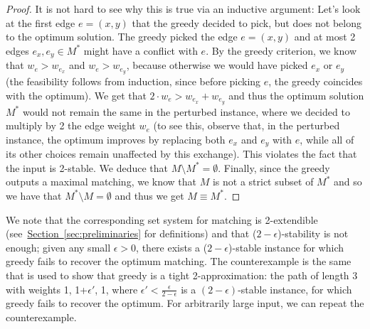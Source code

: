 \begin{proof}
It is not hard to see why this is true via an inductive argument: Let's look at the first edge $e=(x,y)$ that the greedy decided to pick, but does not belong to the optimum solution. The greedy picked the edge $e=(x,y)$ and at most 2 edges $e_x, e_y \in M^*$ might have a conflict with $e$. By the greedy criterion, we know that $w_e > w_{e_x}$ and $w_e > w_{e_y}$, because otherwise we would have picked $e_x$ or $e_y$ (the feasibility follows from induction, since before picking $e$, the greedy coincides with the optimum). We get that $2\cdot w_e > w_{e_x}+w_{e_y}$ and thus the optimum solution $M^*$ would not remain the same in the perturbed instance, where we decided to multiply by 2 the edge weight $w_e$ (to see this, observe that, in the perturbed instance, the optimum improves by replacing both $e_x$ and $e_y$ with $e$, while all of its other choices remain unaffected by this exchange). This violates the fact that the input is 2-stable. We deduce that $M\setminus M^* = \emptyset$. Finally, since the greedy outputs a maximal matching, we know that $M$ is not a strict subset of $M^*$ and so we have that $M^*\setminus M=\emptyset$ and thus we get $M\equiv M^*$.
\end{proof}

We note that the corresponding set system for matching is 2-extendible (see~\hyperref[sec:preliminaries]{Section~\ref{sec:preliminaries}} for definitions) and that ($2-\epsilon$)-stability is not enough; given any small $\epsilon>0$, there exists a ($2-\epsilon$)-stable instance for which greedy fails to recover the optimum matching. The counterexample is the same that is used to show that greedy is a tight 2-approximation: the path of length 3 with weights 1, 1+$\epsilon'$, 1, where $\epsilon'<\tfrac{\epsilon}{2-\epsilon}$ is a $(2-\epsilon)$-stable instance, for which greedy fails to recover the optimum. For arbitrarily large input, we can repeat the counterexample.

